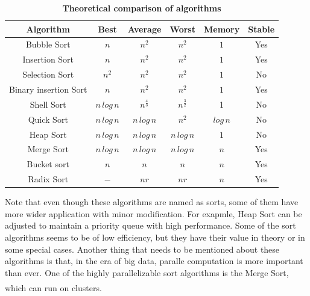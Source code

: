 \documentclass[cn,black,12pt,normal]{elegantnote}
\newcommand{\uct}[1]{\textsuperscript{\textsuperscript{\cite{#1}}}}
\begin{document}
\begin{table}[H]
    \caption{\textbf{Theoretical comparison of algorithms}}
    \centering
    \begin{tabular}{cccccc}
        \toprule
        Algorithm             & Best            & Average           & Worst             & Memory     & Stable \\
        \midrule
        Bubble Sort           & $n$             & $n^2$             & $n^2$             & $1$        & Yes    \\
        Insertion Sort        & $n$             & $n^2$             & $n^2$             & $1$        & Yes    \\
        Selection Sort        & $n^2$           & $n^2$             & $n^2$             & $1$        & No    \\
        Binary insertion Sort & $n$             & $n^2$             & $n^2$             & $1$        & Yes    \\
        Shell Sort            & $n \, log \, n$ & $n^{\frac{4}{3}}$ & $n^{\frac{3}{2}}$ & 1          & No     \\
        Quick Sort            & $n \, log \, n$ & $n \, log \, n$   & $n^2$             & $log \, n$ & No     \\
        Heap Sort             & $n \, log \, n$ & $n \, log \, n$   & $n \, log \, n$   & $1$        & No     \\
        Merge Sort            & $n \, log \, n$ & $n \, log \, n$   & $n \, log \, n$   & $n$        & Yes    \\
        Bucket sort           & $n$             & $n$               & $n$               & $n$        & Yes    \\
        Radix Sort            & $-$             & $nr$              & $nr$              & $n$        & Yes    \\
        \bottomrule
    \end{tabular}
\end{table}

Note that even though these algorithms are named as sorts, some of them have more wider application with minor modification. For exapmle, Heap Sort can be adjusted to maintain a priority queue with high performance. Some of the sort algorithms seems to be of low efficiency, but they have their value in theory or in some special cases. Another thing that needs to be mentioned about these algorithms is that, in the era of big data, paralle computation is more important than ever. One of the highly parallelizable sort algorithms is the Merge Sort, which can run on clusters.\uct{ajtai19830}
\end{document}
